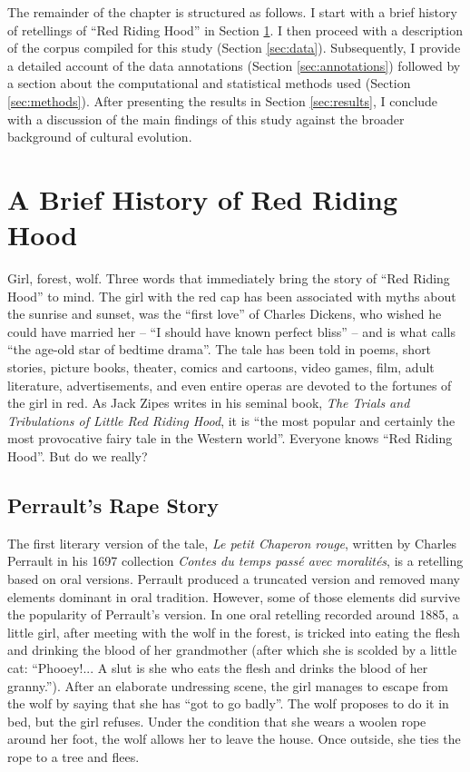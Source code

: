 The remainder of the chapter is structured as follows. I start with a brief history of retellings of ``Red Riding Hood'' in Section \ref{sec:rrh}. I then proceed with a description of the corpus compiled for this study (Section \ref{sec:data}). Subsequently, I provide a detailed account of the data annotations (Section \ref{sec:annotations}) followed by a section about the computational and statistical methods used (Section \ref{sec:methods}). After presenting the results in Section \ref{sec:results}, I conclude with a discussion of the main findings of this study against the broader background of cultural evolution.

\section{A Brief History of Red Riding Hood}\label{sec:rrh}

Girl, forest, wolf. Three words that immediately bring the story of ``Red Riding Hood'' to mind. The girl with the red cap has been associated with myths about the sunrise and sunset\autocite[18]{zipes:1993}, was the ``first love''\autocite[xv:xvi]{beckett:2002} of Charles Dickens, who wished he could have married her -- ``I should have known perfect bliss'' -- and is what \citeauthor{orenstein:2002} calls ``the age-old star of bedtime drama''\autocite[3]{orenstein:2002}. The tale has been told in poems, short stories, picture books, theater, comics and cartoons, video games, film, adult literature, advertisements, and even entire operas are devoted to the fortunes of the girl in red\autocite{beckett:2008,zipes:1993}. As Jack Zipes writes in his seminal book, \emph{The Trials and Tribulations of Little Red Riding Hood}, it is ``the most popular and certainly the most provocative fairy tale in the Western world''\autocite[343]{zipes:1993}. Everyone knows ``Red Riding Hood''. But do we really?

\subsection{Perrault's Rape Story}
The first literary version of the tale, \emph{Le petit Chaperon rouge}, written by Charles Perrault in his 1697 collection \emph{Contes du temps passé avec moralités}, is a retelling based on oral versions\autocite[20]{zipes:1993}. Perrault produced a truncated version and removed many elements dominant in oral tradition. However, some of those elements did survive the popularity of Perrault's version. In one oral retelling recorded around 1885\autocite[21-23]{zipes:1993}, a little girl, after meeting with the wolf in the forest, is tricked into eating the flesh and drinking the blood of her grandmother (after which she is scolded by a little cat: ``Phooey!... A slut is she who eats the flesh and drinks the blood of her granny.''). After an elaborate undressing scene, the girl manages to escape from the wolf by saying that she has ``got to go badly''. The wolf proposes to do it in bed, but the girl refuses. Under the condition that she wears a woolen rope around her foot, the wolf allows her to leave the house. Once outside, she ties the rope to a tree and flees. 

